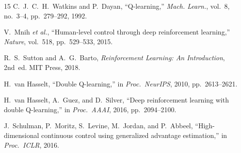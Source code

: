 \documentclass[conference]{IEEEtran}
\begin{document}
\begin{thebibliography}{15}
C.~J.~C.~H.~Watkins and P.~Dayan,
``Q-learning,''
\textit{Mach. Learn.}, vol.~8, no.~3--4, pp.~279--292, 1992.

V.~Mnih \textit{et al.},
``Human-level control through deep reinforcement learning,''
\textit{Nature}, vol.~518, pp.~529--533, 2015.

R.~S.~Sutton and A.~G.~Barto,
\textit{Reinforcement Learning: An Introduction}, 2nd~ed.
MIT Press, 2018.

H.~van Hasselt,
``Double Q-learning,''
in \textit{Proc.\ NeurIPS}, 2010, pp.~2613--2621.

H.~van Hasselt, A.~Guez, and D.~Silver,
``Deep reinforcement learning with double Q-learning,''
in \textit{Proc.\ AAAI}, 2016, pp.~2094--2100.

J.~Schulman, P.~Moritz, S.~Levine, M.~Jordan, and P.~Abbeel,
``High-dimensional continuous control using generalized advantage
estimation,''
in \textit{Proc.\ ICLR}, 2016.

\end{thebibliography}
\end{document}
